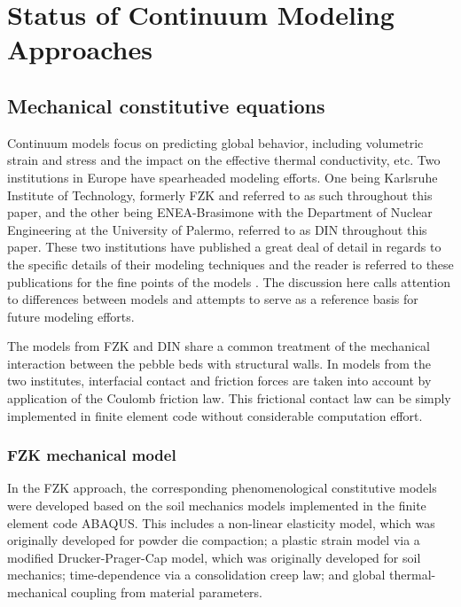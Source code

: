 

\section{Status of Continuum Modeling Approaches}
\subsection{Mechanical constitutive equations}
Continuum models focus on predicting global behavior, including volumetric strain and stress and the impact on the effective thermal conductivity, etc. Two institutions in Europe have spearheaded modeling efforts. One being Karlsruhe Institute of Technology, formerly FZK and referred to as such throughout this paper, and the other being ENEA-Brasimone with the Department of Nuclear Engineering at the University of Palermo, referred to as DIN throughout this paper. These two institutions have published a great deal of detail in regards to the specific details of their modeling techniques and the reader is referred to these publications for the fine points of the models \cite{DellOrco:2007hc,DellOrco:2010zr,DiMaio20101234,Gan2007189}. The discussion here calls attention to differences between models and attempts to serve as a reference basis for future modeling efforts.

The models from FZK and DIN share a common treatment of the mechanical interaction between the pebble beds with structural walls. In models from the two institutes, interfacial contact and friction forces are taken into account by application of the Coulomb friction law. This frictional contact law can be simply implemented in finite element code without considerable computation effort.

\subsubsection{FZK mechanical model}
In the FZK approach, the corresponding phenomenological constitutive models were developed based on the soil mechanics models implemented in the finite element code ABAQUS. This includes a non-linear elasticity model, which was originally developed for powder die compaction; a plastic strain model via a modified Drucker-Prager-Cap model, which was originally developed for soil mechanics; time-dependence via a consolidation creep law; and global thermal-mechanical coupling from material parameters.

